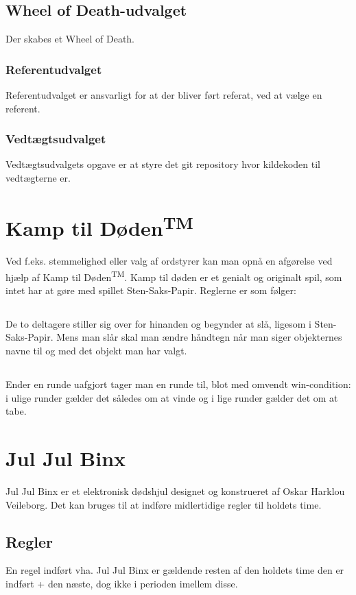 \documentclass{article}
\begin{document}
	\subsection{Wheel of Death-udvalget}
	Der skabes et Wheel of Death.
	\subsubsection{Referentudvalget}
	Referentudvalget er ansvarligt for at der bliver ført referat, ved at vælge en referent.
	\subsubsection{Vedtægtsudvalget}
	Vedtægtsudvalgets opgave er at styre det git repository hvor kildekoden til vedtægterne er.
	
	
	\section{Kamp til Døden\textsuperscript{TM}}
	Ved f.eks. stemmelighed eller valg af ordstyrer kan man opnå en afgørelse ved hjælp af Kamp til Døden\textsuperscript{TM}. Kamp til døden er et genialt og originalt spil, som intet har at gøre med spillet Sten-Saks-Papir. Reglerne er som følger:
	\subsection{}
	De to deltagere stiller sig over for hinanden og begynder at slå, ligesom i Sten-Saks-Papir. Mens man slår skal man ændre håndtegn når man siger objekternes navne til og med det objekt man har valgt.
	\subsection{}
	Ender en runde uafgjort tager man en runde til, blot med omvendt win-condition: i ulige runder gælder det således om at vinde og i lige runder gælder det om at tabe.
	
	\section{Jul Jul Binx}
	Jul Jul Binx er et elektronisk dødshjul designet og konstrueret af Oskar Harklou Veileborg. Det kan bruges til at indføre midlertidige regler til holdets time.
	\subsection{Regler}
	En regel indført vha. Jul Jul Binx er gældende resten af den holdets time den er indført + den næste, dog ikke i perioden imellem disse.
\end{document}
